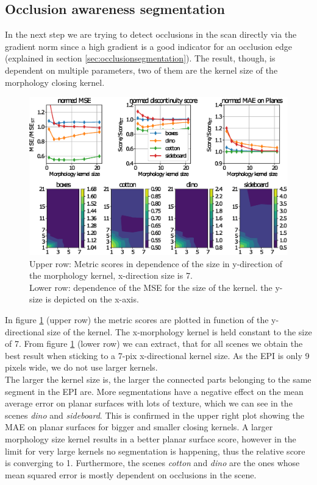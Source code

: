 \documentclass  [
  paper    = a4,
  BCOR     = 10mm,
  twoside,
  fontsize = 12pt,
  fleqn,
  toc      = bibnumbered,
  toc      = listofnumbered,
  numbers  = noendperiod,
  headings = normal,
  listof   = leveldown,
  version  = 3.03
]                                       {scrreprt}
\begin{document}
\subsection{Occlusion awareness segmentation}
\label{sec:occlusionawareness}
In the next step we are trying to detect occlusions in the scan directly via the gradient norm since a high gradient is a good indicator for an occlusion edge (explained in section \ref{sec:occlusionsegmentation}). The result, though, is dependent on multiple parameters, two of them are the kernel size of the morphology closing kernel.
\begin{figure}[h!]
	\centering
	\includegraphics[width=0.8\linewidth]{images/thresh_segm_morph}
	\caption[Segmentation of EPI dependence on the morphology kernel]{Upper row: Metric scores in dependence of the size in y-direction of the morphology kernel, x-direction size is 7.\\ Lower row: dependence of the MSE for the size of the kernel. the y-size is depicted on the x-axis.}
	\label{fig:threshsegmmorph}
\end{figure}
In figure \ref{fig:threshsegmmorph} (upper row) the metric scores are plotted in function of the y-directional size of the kernel. The x-morphology kernel is held constant to the size of 7. From figure \ref{fig:threshsegmmorph} (lower row) we can extract, that for all scenes we obtain the best result when sticking to a 7-pix x-directional kernel size. As the EPI is only 9 pixels wide, we do not use larger kernels.\\
The larger the kernel size is, the larger the connected parts belonging to the same segment in the EPI are. More segmentations have a negative effect on the mean average error on planar surfaces with lots of texture, which we can see in the scenes \textit{dino} and \textit{sideboard}. This is confirmed in the upper right plot showing the MAE on planar surfaces for bigger and smaller closing kernels. A larger morphology size kernel results in a better planar surface score, however in the limit for very large kernels no segmentation is happening, thus the relative score is converging to 1. Furthermore, the scenes \textit{cotton} and \textit{dino} are the ones whose mean squared error is mostly dependent on occlusions in the scene.
\end{document}
